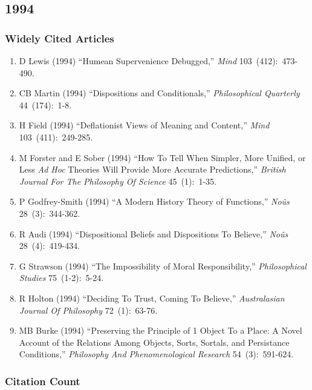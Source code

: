 \documentclass[
  10pt,
  letterpaper,
  DIV=11,
  numbers=noendperiod,
  twoside]{scrartcl}
\providecommand{\tightlist}{%
  \setlength{\itemsep}{0pt}\setlength{\parskip}{0pt}}\usepackage{longtable,booktabs,array}
\begin{document}
\newpage

\subsection{1994}\label{sec-s1994}

\subsubsection*{Widely Cited Articles}\label{widely-cited-articles-38}

\begin{enumerate}
\def\labelenumi{\arabic{enumi}.}
\tightlist
\item
  D Lewis (1994) ``Humean Supervenience Debugged,'' \emph{Mind}
  103~(412):~473-490.
\item
  CB Martin (1994) ``Dispositions and Conditionals,''
  \emph{Philosophical Quarterly} 44~(174):~1-8.
\item
  H Field (1994) ``Deflationist Views of Meaning and Content,''
  \emph{Mind} 103~(411):~249-285.
\item
  M Forster and E Sober (1994) ``How To Tell When Simpler, More Unified,
  or Less \emph{Ad Hoc} Theories Will Provide More Accurate
  Predictions,'' \emph{British Journal For The Philosophy Of Science}
  45~(1):~1-35.
\item
  P Godfrey-Smith (1994) ``A Modern History Theory of Functions,''
  \emph{Noûs} 28~(3):~344-362.
\item
  R Audi (1994) ``Dispositional Beliefs and Dispositions To Believe,''
  \emph{Noûs} 28~(4):~419-434.
\item
  G Strawson (1994) ``The Impossibility of Moral Responsibility,''
  \emph{Philosophical Studies} 75~(1-2):~5-24.
\item
  R Holton (1994) ``Deciding To Trust, Coming To Believe,''
  \emph{Australasian Journal Of Philosophy} 72~(1):~63-76.
\item
  MB Burke (1994) ``Preserving the Principle of 1 Object To a Place: A
  Novel Account of the Relations Among Objects, Sorts, Sortals, and
  Persistance Conditions,'' \emph{Philosophy And Phenomenological
  Research} 54~(3):~591-624.
\end{enumerate}

\subsubsection*{Citation Count}\label{sec-count-1994}
\end{document}
